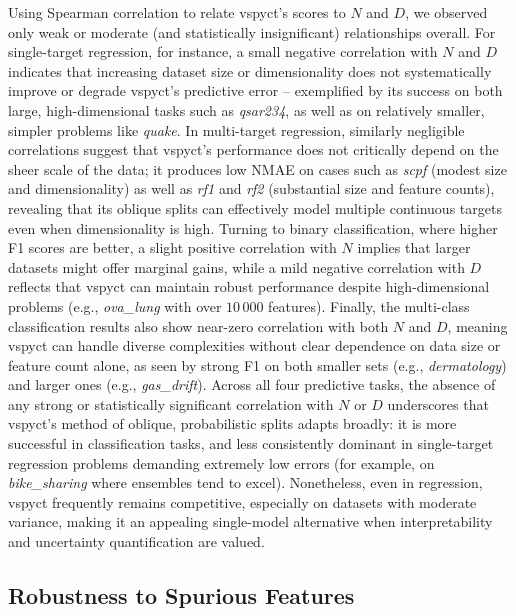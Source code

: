 \documentclass[3p,review,authoryear]{elsarticle}
\begin{document}
Using Spearman correlation to relate \gls{vspyct}’s scores to $N$ and $D$, we observed only weak or moderate (and statistically insignificant) relationships overall.
For single-target regression, for instance, a small negative correlation with $N$ and $D$ indicates that increasing dataset size or dimensionality does not systematically improve or degrade \gls{vspyct}’s predictive error -- exemplified by its success on both large, high-dimensional tasks such as \emph{qsar234}, as well as on relatively smaller, simpler problems like \emph{quake}.
In multi-target regression, similarly negligible correlations suggest that \gls{vspyct}’s performance does not critically depend on the sheer scale of the data; it produces low NMAE on cases such as \emph{scpf} (modest size and dimensionality) as well as \emph{rf1} and \emph{rf2} (substantial size and feature counts), revealing that its oblique splits can effectively model multiple continuous targets even when dimensionality is high.
Turning to binary classification, where higher F1 scores are better, a slight positive correlation with $N$ implies that larger datasets might offer marginal gains, while a mild negative correlation with $D$ reflects that \gls{vspyct} can maintain robust performance despite high-dimensional problems (e.g., \emph{ova\_lung} with over $10\,000$ features).
Finally, the multi-class classification results also show near-zero correlation with both $N$ and $D$, meaning \gls{vspyct} can handle diverse complexities without clear dependence on data size or feature count alone, as seen by strong F1 on both smaller sets (e.g., \emph{dermatology}) and larger ones (e.g., \emph{gas\_drift}).
Across all four predictive tasks, the absence of any strong or statistically significant correlation with $N$ or $D$ underscores that \gls{vspyct}’s method of oblique, probabilistic splits adapts broadly: it is more successful in classification tasks, and less consistently dominant in single-target regression problems demanding extremely low errors (for example, on \emph{bike\_sharing} where ensembles tend to excel).
Nonetheless, even in regression, \gls{vspyct} frequently remains competitive, especially on datasets with moderate variance, making it an appealing single-model alternative when interpretability and uncertainty quantification are valued. 


\subsection{Robustness to Spurious Features}%
\label{sec:noise_features}
\end{document}
